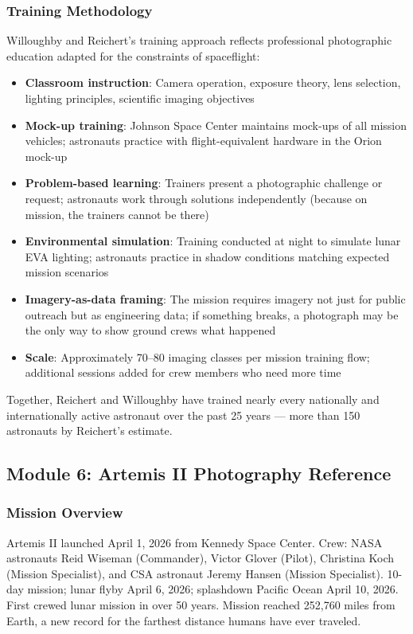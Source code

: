 \documentclass[11pt,letterpaper]{article}
\begin{document}
\subsubsection{Training Methodology}

Willoughby and Reichert's training approach reflects professional photographic education adapted for the constraints of spaceflight:

\begin{itemize}[leftmargin=1.5em]
  \item \textbf{Classroom instruction}: Camera operation, exposure theory, lens selection, lighting principles, scientific imaging objectives
  \item \textbf{Mock-up training}: Johnson Space Center maintains mock-ups of all mission vehicles; astronauts practice with flight-equivalent hardware in the Orion mock-up
  \item \textbf{Problem-based learning}: Trainers present a photographic challenge or request; astronauts work through solutions independently (because on mission, the trainers cannot be there)
  \item \textbf{Environmental simulation}: Training conducted at night to simulate lunar EVA lighting; astronauts practice in shadow conditions matching expected mission scenarios
  \item \textbf{Imagery-as-data framing}: The mission requires imagery not just for public outreach but as engineering data; if something breaks, a photograph may be the only way to show ground crews what happened
  \item \textbf{Scale}: Approximately 70--80 imaging classes per mission training flow; additional sessions added for crew members who need more time
\end{itemize}

Together, Reichert and Willoughby have trained nearly every nationally and internationally active astronaut over the past 25 years --- more than 150 astronauts by Reichert's estimate.

\subsection{Module 6: Artemis II Photography Reference}

\subsubsection{Mission Overview}

Artemis II launched April 1, 2026 from Kennedy Space Center. Crew: NASA astronauts Reid Wiseman (Commander), Victor Glover (Pilot), Christina Koch (Mission Specialist), and CSA astronaut Jeremy Hansen (Mission Specialist). 10-day mission; lunar flyby April 6, 2026; splashdown Pacific Ocean April 10, 2026. First crewed lunar mission in over 50 years. Mission reached 252,760 miles from Earth, a new record for the farthest distance humans have ever traveled.
\end{document}
